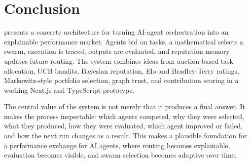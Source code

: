 \section{Conclusion}

\systemname{} presents a concrete architecture for turning AI-agent orchestration into an explainable performance market. Agents bid on tasks, a mathematical \marketmaker{} selects a swarm, execution is traced, outputs are evaluated, and reputation memory updates future routing. The system combines ideas from auction-based task allocation, UCB bandits, Bayesian reputation, Elo and Bradley-Terry ratings, Markowitz-style portfolio selection, graph trust, and contribution scoring in a working Next.js and TypeScript prototype.

The central value of the system is not merely that it produces a final answer. It makes the process inspectable: which agents competed, why they were selected, what they produced, how they were evaluated, which agent improved or failed, and how the next run changes as a result. This makes \systemname{} a plausible foundation for a performance exchange for AI agents, where routing becomes explainable, evaluation becomes visible, and swarm selection becomes adaptive over time.
